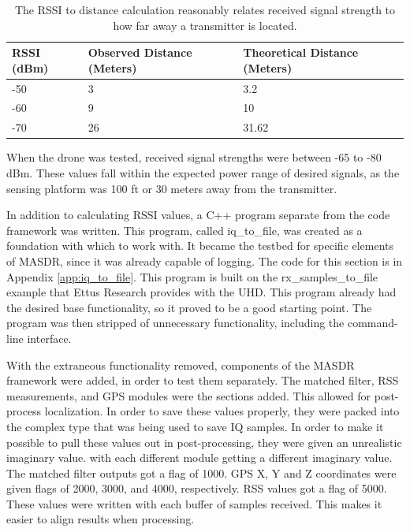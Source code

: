 \documentclass[journal,transmag]{IEEEtran}
\begin{document}
\begin{table}[ht]
\centering
\caption{The RSSI to distance calculation reasonably relates received signal strength to how far away a transmitter is located.}
\label{table:RSSI_Results}
\begin{tabular}{|l|l|l|} \hline
  RSSI (dBm) & Observed Distance (Meters) & Theoretical Distance (Meters) \\ \hline
  -50 & 3 & 3.2 \\
  -60 & 9 & 10 \\
  -70 & 26 & 31.62 \\ \hline
\end{tabular}
\end{table}\par

When the drone was tested, received signal strengths were between -65 to -80 dBm. These values fall within the expected power range of desired signals, as the sensing platform was 100 ft or 30 meters away from the transmitter. \par
In addition to calculating RSSI values, a C++ program separate from the code framework
was written. This program, called iq\_to\_file, was created as a foundation with 
which to work with. It became the testbed for specific elements of MASDR, since it
was already capable of logging. The code for this section is in Appendix \ref{app:iq_to_file}. 
This program is built on the rx\_samples\_to\_file example that Ettus Research provides 
with the UHD. This program already had the desired base functionality, so it proved
to be a good starting point. The program was then stripped of unnecessary functionality,
including the command-line interface. \par
With the extraneous functionality removed, components of the MASDR framework were
added, in order to test them separately. The matched filter, RSS measurements, 
and GPS modules were the sections added. This allowed for post-process localization. In order to 
save these values properly, they were packed into the complex type that was being
used to save IQ samples. In order to make it possible to pull these values out
in post-processing, they were given an unrealistic imaginary value. with each different 
module getting a different imaginary value. The matched filter outputs got 
a flag of 1000. GPS X, Y and Z coordinates were given flags of 2000, 3000, and 4000,
respectively. RSS values got a flag of 5000. These values were written with each 
buffer of samples received. This makes it easier to align results when processing.\par
\end{document}

